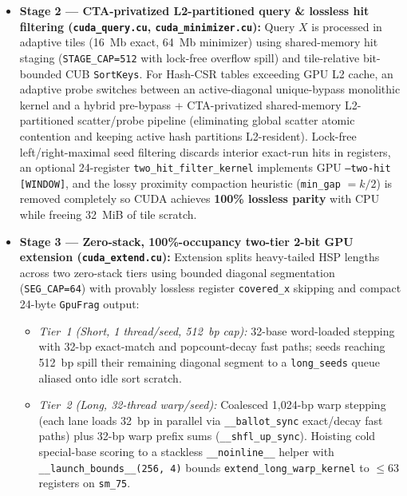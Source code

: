 \documentclass[pdflatex,sn-vancouver,Numbered]{sn-jnl}
\begin{document}
\begin{itemize}
\begin{itemize}
        \item \emph{GPU Canonical Minimizer Super-Seeding (\texttt{cuda\_minimizer.cu}, default for contiguous $k \ge 18$):} Zero-stack CTA shared-memory sliding-window minimizer extraction hashed via a 48-bit bijective mixer (\texttt{mix48}, 6 CUB radix passes, 0\% $k'$-mer tag collisions), exact per-strand \texttt{freq\_limit} resolution, and a GPU exact-$k$ overflow CSR for high-frequency buckets ($> M_{\text{cap}}$), shrinking sort traffic $\sim$7.5$\times$ and permanent Hash-CSR memory $\sim$5.1$\times$.
    \end{itemize}
    \item \textbf{Stage 2 --- CTA-privatized L2-partitioned query \& lossless hit filtering (\texttt{cuda\_query.cu}, \texttt{cuda\_minimizer.cu}):} Query $X$ is processed in adaptive tiles (16~Mb exact, 64~Mb minimizer) using shared-memory hit staging (\texttt{STAGE\_CAP=512} with lock-free overflow spill) and tile-relative bit-bounded CUB \texttt{SortKeys}. For Hash-CSR tables exceeding GPU L2 cache, an adaptive probe switches between an active-diagonal unique-bypass monolithic kernel and a hybrid pre-bypass + CTA-privatized shared-memory L2-partitioned scatter/probe pipeline (eliminating global scatter atomic contention and keeping active hash partitions L2-resident). Lock-free left/right-maximal seed filtering discards interior exact-run hits in registers, an optional 24-register \texttt{two\_hit\_filter\_kernel} implements GPU \texttt{--two-hit [WINDOW]}, and the lossy proximity compaction heuristic (\texttt{min\_gap} $= k/2$) is removed completely so CUDA achieves \textbf{100\% lossless parity} with CPU while freeing 32~MiB of tile scratch.
    \item \textbf{Stage 3 --- Zero-stack, 100\%-occupancy two-tier 2-bit GPU extension (\texttt{cuda\_extend.cu}):} Extension splits heavy-tailed HSP lengths across two zero-stack tiers using bounded diagonal segmentation (\texttt{SEG\_CAP=64}) with provably lossless register \texttt{covered\_x} skipping and compact 24-byte \texttt{GpuFrag} output:
    \begin{itemize}
        \item \emph{Tier~1 (Short, 1 thread/seed, 512~bp cap):} 32-base word-loaded stepping with 32-bp exact-match and popcount-decay fast paths; seeds reaching 512~bp spill their remaining diagonal segment to a \texttt{long\_seeds} queue aliased onto idle sort scratch.
        \item \emph{Tier~2 (Long, 32-thread warp/seed):} Coalesced 1,024-bp warp stepping (each lane loads 32~bp in parallel via \texttt{\_\_ballot\_sync} exact/decay fast paths) plus 32-bp warp prefix sums (\texttt{\_\_shfl\_up\_sync}). Hoisting cold special-base scoring to a stackless \texttt{\_\_noinline\_\_} helper with \texttt{\_\_launch\_bounds\_\_(256, 4)} bounds \texttt{extend\_long\_warp\_kernel} to $\le 63$ registers on \texttt{sm\_75}.

\end{itemize}
\end{itemize}
\end{document}
